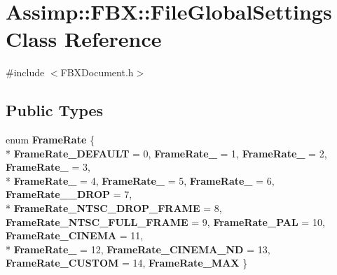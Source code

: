 \hypertarget{class_assimp_1_1_f_b_x_1_1_file_global_settings}{\section{Assimp\+:\+:F\+B\+X\+:\+:File\+Global\+Settings Class Reference}
\label{class_assimp_1_1_f_b_x_1_1_file_global_settings}
}


{\ttfamily \#include $<$F\+B\+X\+Document.\+h$>$}

\subsection*{Public Types}
\begin{DoxyCompactItemize}
\item 
\hypertarget{class_assimp_1_1_f_b_x_1_1_file_global_settings_afad16e10381e94b81f98593e5c4b475a}{enum {\bfseries Frame\+Rate} \{ \\*
{\bfseries Frame\+Rate\+\_\+\+D\+E\+F\+A\+U\+L\+T} = 0, 
{\bfseries Frame\+Rate\+\_} = 1, 
{\bfseries Frame\+Rate\+\_} = 2, 
{\bfseries Frame\+Rate\+\_} = 3, 
\\*
{\bfseries Frame\+Rate\+\_} = 4, 
{\bfseries Frame\+Rate\+\_} = 5, 
{\bfseries Frame\+Rate\+\_} = 6, 
{\bfseries Frame\+Rate\+\_\+\_\+\+D\+R\+O\+P} = 7, 
\\*
{\bfseries Frame\+Rate\+\_\+\+N\+T\+S\+C\+\_\+\+D\+R\+O\+P\+\_\+\+F\+R\+A\+M\+E} = 8, 
{\bfseries Frame\+Rate\+\_\+\+N\+T\+S\+C\+\_\+\+F\+U\+L\+L\+\_\+\+F\+R\+A\+M\+E} = 9, 
{\bfseries Frame\+Rate\+\_\+\+P\+A\+L} = 10, 
{\bfseries Frame\+Rate\+\_\+\+C\+I\+N\+E\+M\+A} = 11, 
\\*
{\bfseries Frame\+Rate\+\_} = 12, 
{\bfseries Frame\+Rate\+\_\+\+C\+I\+N\+E\+M\+A\+\_\+\+N\+D} = 13, 
{\bfseries Frame\+Rate\+\_\+\+C\+U\+S\+T\+O\+M} = 14, 
{\bfseries Frame\+Rate\+\_\+\+M\+A\+X}
 \}}\label{class_assimp_1_1_f_b_x_1_1_file_global_settings_afad16e10381e94b81f98593e5c4b475a}

\end{DoxyCompactItemize}
